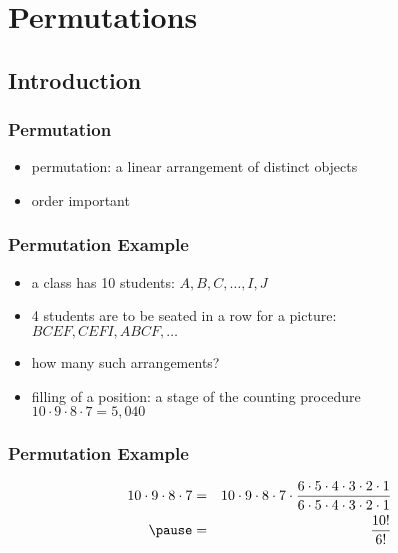 \documentclass[dvipsnames]{beamer}
\begin{document}
\section{Permutations}

\subsection{Introduction}

\begin{frame}
  \frametitle{Permutation}

  \begin{itemize}
    \item \alert{permutation}: a linear arrangement of distinct objects
    \item order important
  \end{itemize}
\end{frame}

\begin{frame}
  \frametitle{Permutation Example}

  \begin{itemize}
    \item a class has 10 students: $A, B, C, \ldots, I, J$
    \item 4 students are to be seated in a row for a picture:\\
      \smallskip
      $BCEF, CEFI, ABCF, \ldots$
    \item how many such arrangements?

    \pause
    \medskip
    \item filling of a position: a stage of the counting procedure\\
      $10 \cdot 9 \cdot 8 \cdot 7 = 5,040$
  \end{itemize}
\end{frame}

\begin{frame}
  \frametitle{Permutation Example}

  \begin{eqnarray*}
    10 \cdot 9 \cdot 8 \cdot 7 & = &
      10 \cdot 9 \cdot 8 \cdot 7 \cdot
      \frac{6 \cdot 5 \cdot 4 \cdot 3 \cdot 2 \cdot 1}
      {6 \cdot 5 \cdot 4 \cdot 3 \cdot 2 \cdot 1}\\\pause
    & = & \frac{10!}{6!}
  \end{eqnarray*}
\end{frame}
\end{document}

